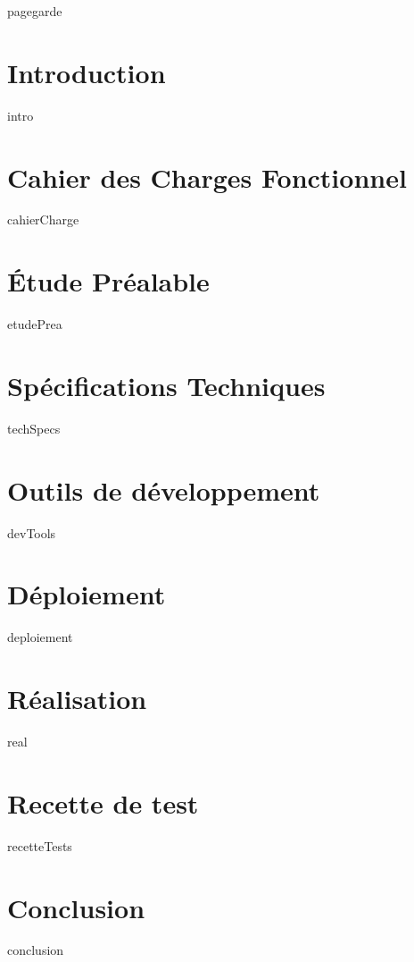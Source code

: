 \documentclass[a4paper, 12pt, titlepage, oneside, french]{article}
\begin{document}
{pagegarde}
\newpage

\tableofcontents
\newpage

\section{Introduction}
{intro}
\newpage

\section{Cahier des Charges Fonctionnel}
{cahierCharge}
\newpage

\section{Étude Préalable}
{etudePrea}
\newpage

\section{Spécifications Techniques}
{techSpecs}
\newpage

\section{Outils de développement}
{devTools}
\newpage

\section{Déploiement}
{deploiement}
\newpage

\section{Réalisation}
{real}
\newpage

\section{Recette de test}
{recetteTests}
\newpage

\section{Conclusion}
{conclusion}
\newpage

\printglossary[title=Acronymes,type=\acronymtype]
\newpage 
\printglossary
\newpage 

\printbibliography
\end{document}
